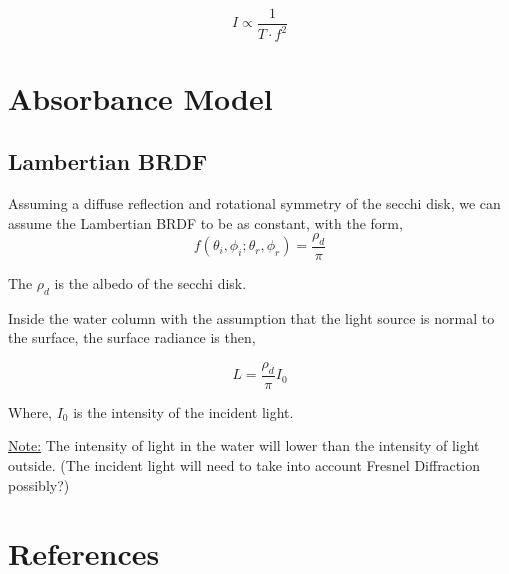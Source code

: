 \documentclass{article}
\begin{document}
$$ I \propto \frac{1}{T \cdot f^2}$$    
\section{Absorbance Model}
\subsection{Lambertian BRDF}
Assuming a diffuse reflection and rotational symmetry of the
secchi disk, we can assume the Lambertian BRDF to be
as constant, with the form,
\[
f(\theta_i, \phi_i; \theta_r , \phi_r) = \frac{\rho_d}{\pi}
\]

The $\rho_d$ is the albedo of the secchi disk.

Inside the water column with the assumption that the light source is normal to the surface,
the surface radiance is then,

\[
L = \frac{\rho_d}{\pi} I_0
\]

Where, $I_0$ is the intensity of the incident light.

\underline{Note:} The intensity of light in the water will lower than
the intensity of light outside.
(The incident light will need to take into account Fresnel Diffraction possibly?)

\section{References}

\begin{thebibliography}{9}
\end{thebibliography}
\end{document}
